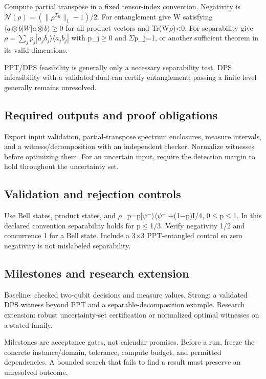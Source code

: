 \documentclass[
  11pt,
]{article}
\begin{document}
Compute partial transpose in a fixed tensor-index convention. Negativity
is \(\mathcal N(\rho)=(\|\rho^{T_B}\|_1-1)/2\). For entanglement give W
satisfying \(\langle a\otimes b|W|a\otimes b\rangle\ge0\) for all
product vectors and Tr(W\ensuremath{\rho})<0. For separability give
\(\rho=\sum_jp_j|a_jb_j\rangle\langle a_jb_j|\) with
p\_j\ensuremath{\ge}0 and \ensuremath{\Sigma}p\_j=1, or another
sufficient theorem in its valid dimensions.

PPT/DPS feasibility is generally only a necessary separability test. DPS
infeasibility with a validated dual can certify entanglement; passing a
finite level generally remains unresolved.

\subsection{Required outputs and proof obligations}

Export input validation, partial-transpose spectrum enclosures, measure
intervals, and a witness/decomposition with an independent checker.
Normalize witnesses before optimizing them. For an uncertain input,
require the detection margin to hold throughout the uncertainty set.

\subsection{Validation and rejection controls}

Use Bell states, product states, and
\ensuremath{\rho}\_p=p|\ensuremath{\psi}\ensuremath{{}^{-}}\ensuremath{\rangle}\ensuremath{\langle}\ensuremath{\psi}\ensuremath{{}^{-}}|+(1\ensuremath{-}p)I/4,
0\ensuremath{\le}p\ensuremath{\le}1. In this declared convention
separability holds for p\ensuremath{\le}1/3. Verify negativity 1/2 and
concurrence 1 for a Bell state. Include a 3\ensuremath{\times}3
PPT-entangled control so zero negativity is not mislabeled separability.

\subsection{Milestones and research extension}

Baseline: checked two-qubit decisions and measure values. Strong: a
validated DPS witness beyond PPT and a separable-decomposition example.
Research extension: robust uncertainty-set certification or normalized
optimal witnesses on a stated family.

Milestones are acceptance gates, not calendar promises. Before a run,
freeze the concrete instance/domain, tolerance, compute budget, and
permitted dependencies. A bounded search that fails to find a result
must preserve an unresolved outcome.
\end{document}
